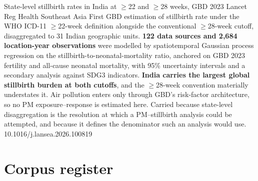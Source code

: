 \documentclass[10pt]{article}
\begin{document}
{State-level stillbirth rates in India at $\geq$22 and $\geq$28 weeks, GBD 2023}
{Lancet Reg Health Southeast Asia}
{First GBD estimation of stillbirth rate under the WHO ICD-11 $\geq$22-week definition
alongside the conventional $\geq$28-week cutoff, disaggregated to 31 Indian geographic
units. \textbf{122 data sources and 2{,}684 location-year observations} were modelled by
spatiotemporal Gaussian process regression on the stillbirth-to-neonatal-mortality ratio,
anchored on GBD 2023 fertility and all-cause neonatal mortality, with 95\% uncertainty
intervals and a secondary analysis against SDG3 indicators. \textbf{India carries the
largest global stillbirth burden at both cutoffs}, and the $\geq$28-week convention
materially understates it. Air pollution enters only through GBD's risk-factor
architecture, so no PM exposure--response is estimated here. Carried because state-level
disaggregation is the resolution at which a PM--stillbirth analysis could be attempted, and
because it defines the denominator such an analysis would use.}
{10.1016/j.lansea.2026.100819}

\clearpage

\section*{\sffamily\bfseries\color{Deep}Corpus register}
\vspace{-1.5mm}{\color{Amber}\rule{\linewidth}{1.1pt}}\vspace{2.5mm}


\end{document}
